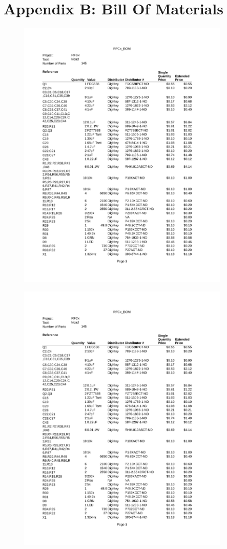 \documentclass{article}
\begin{document}
{\section{Appendix B: Bill Of Materials}
\begin{figure}[H]
	\centering
	\includegraphics[page=1,width=0.9\textwidth]{RFCx_BOM.pdf}
	\caption{}
	\label{fig:bom1}
\end{figure}
\begin{figure}[H]
	\centering
	\includegraphics[page=2,width=0.9\textwidth]{RFCx_BOM.pdf}

\end{figure}}
\end{document}
